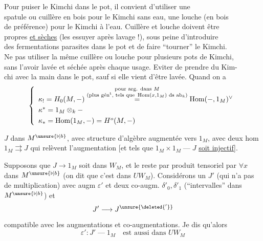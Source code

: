 Pour puiser le Kimchi dans le pot, il convient d'utiliser une\\
spatule ou cuillère en bois pour le Kimchi sans eau, une louche (en bois\\
de préférence) pour le Kimchi à l'eau. Cuillère et louche doivent être\\
propres \uline{et sèches} (les essuyer après lavage !), sous peine d'introduire\\
des fermentations parasites dans le pot et de faire ``tourner'' le Kimchi.\\
Ne pas utiliser la même cuillère ou louche pour plusieurs pots de Kimchi,\\
sans l'avoir lavée et séchée après chaque usage. Eviter de prendre du Kim-\\
chi avec la main dans le pot, sauf si elle vient d'être lavée. Quand on a
\[
\left\{\begin{array}{l}
\kappa_!=H_0(M,-)
\overset{\substack{\text{pour arg. dans }M\\
\text{(plus gén\textsuperscript{t}, tels que }\operatorname{Hom}(x,1_M)\text{ ds }\mathrm{ab}_k)}}{=}
\operatorname{Hom}(-,1_M)^\vee\\[3pt]
\kappa^*=1_M\otimes_k-\\[3pt]
\kappa_*=\operatorname{Hom}(1_M,-)=H^o(M,-)
\end{array}\right.
\]

$J$ dans $M^{\unsure{\flat|b}}$, avec structure d'algèbre augmentée vers
$1_M$, avec deux hom $1_M\rightrightarrows J$ qui relèvent
l'augmentation [et tels que
$1_M\times1_M\mathbin{\text{---}}J$ \uline{soit injectif}].


Supposons que $J\longrightarrow1_M$
soit dans $W_M$, et le reste
par produit tensoriel par $\forall x$ dans $M^{\unsure{\flat|b}}$
(on dit que c'est dans $UW_M$). Considérons
un    $J'$
(qui n'a pas de multiplication) avec
\deleted{$\unsure{\varepsilon}$} augm $\varepsilon'$ et deux co-augm.
$\delta'_0,\delta'_1$ (``intervalles'' dans $M^{\unsure{\flat|b}}$) et
\[
J'\longrightarrow J^{\unsure{\deleted{'}}}
\]
compatible avec les augmentations et
co-augmentations. Je dis qu'alors 
\[
\varepsilon':J'\mathbin{\text{---}}1_M\quad\text{est aussi dans }UW_M
\]

